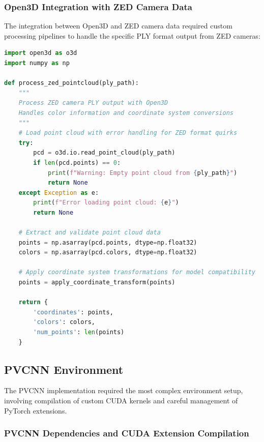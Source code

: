 \documentclass[12pt,a4paper]{report}
\begin{document}
\subsubsection{Open3D Integration with ZED Camera Data}

The integration between Open3D and ZED camera data required custom processing pipelines to handle the specific PLY format output from ZED cameras:

\begin{lstlisting}[caption=Open3D ZED Integration Pipeline, label=lst:open3d_zed, language=python]
import open3d as o3d
import numpy as np

def process_zed_pointcloud(ply_path):
    """
    Process ZED camera PLY output with Open3D
    Handles color information and coordinate system conversions
    """
    # Load point cloud with error handling for ZED format quirks
    try:
        pcd = o3d.io.read_point_cloud(ply_path)
        if len(pcd.points) == 0:
            print(f"Warning: Empty point cloud from {ply_path}")
            return None
    except Exception as e:
        print(f"Error loading point cloud: {e}")
        return None
    
    # Extract and validate point cloud data
    points = np.asarray(pcd.points, dtype=np.float32)
    colors = np.asarray(pcd.colors, dtype=np.float32)
    
    # Apply coordinate system transformations for model compatibility
    points = apply_coordinate_transform(points)
    
    return {
        'coordinates': points,
        'colors': colors,
        'num_points': len(points)
    }
\end{lstlisting}

\subsection{PVCNN Environment}

The PVCNN implementation required the most complex environment setup, involving compilation of custom CUDA kernels and careful management of PyTorch extensions.

\subsubsection{PVCNN Dependencies and CUDA Extension Compilation}
\end{document}
